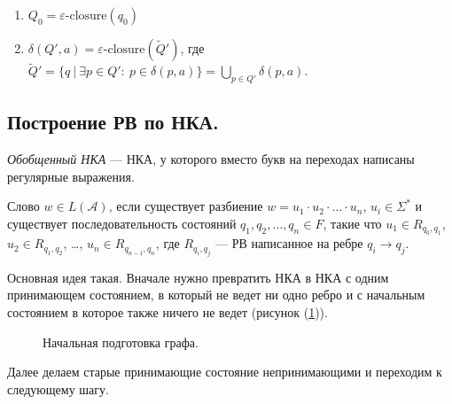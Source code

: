 \begin{enumerate}
  \item $Q_0 = \varepsilon\text{-closure}(q_0)$
  \item $\delta (Q', a)=\varepsilon\text{-closure}(\widetilde{Q}')$, где
        $\widetilde{Q}'=\{q\:|\: \exists p\in Q':\:p\in\delta(p, a)\}=\displaystyle{\bigcup_{p\in Q'}}\delta(p, a).$
\end{enumerate}


\subsection{Построение РВ по НКА.}

\begin{Def}
  \textit{Обобщенный НКА} --- НКА, у которого вместо букв на переходах написаны регулярные выражения.

  Слово $w\in L(\mathcal{A})$, если существует разбиение $w=u_1\cdot u_2\cdot\ldots\cdot u_n$, $u_i\in \Sigma^*$ и существует
  последовательность состояний $q_1, q_2, \ldots, q_n\in F$, такие что $u_1\in R_{q_0, q_1}$, $u_2\in R_{q_1, q_2}$, \ldots, $u_n\in R_{q_{n-1}, q_n}$, где
  $R_{q_i,q_j}$ --- РВ написанное на ребре $q_i\rightarrow q_j$.
\end{Def}

Основная идея такая. Вначале нужно превратить НКА в НКА с одним принимающем состоянием, в который не ведет ни одно ребро и с начальным состоянием
в которое также ничего не ведет (рисунок (\ref{fig:prepare})).

\begin{figure}
  \centering
  \caption{Начальная подготовка графа.}
  \label{fig:prepare}
\end{figure}


Далее делаем старые принимающие состояние непринимающими и переходим к следующему шагу.


